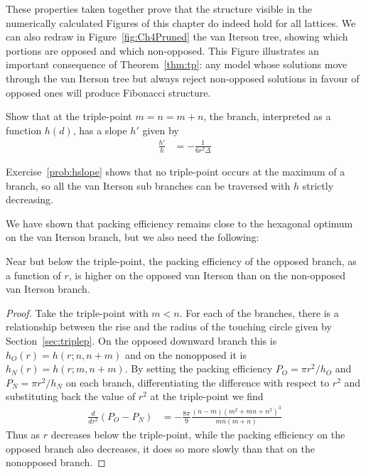 \clearpage
These properties taken together prove that the structure visible in the numerically calculated Figures of this chapter do indeed hold for all lattices. We can also redraw in Figure~\ref{fig:Ch4Pruned} the van Iterson tree, showing which portions are opposed and which non-opposed. This Figure illustrates an important consequence of Theorem~\ref{thm:tp}: any model whose solutions move through the van Iterson tree but always reject non-opposed solutions in favour of opposed ones will produce Fibonacci structure. 



\begin{jExercise}
	Show that at the triple-point  $m=n=m+n$, the  branch, interpreted as a function $h(d)$, has a slope $h'$ given by 
	\begin{align}
		\frac{h'}{h} &= - \frac{1}{6 r^2 \Delta}
	\end{align}
	\label{prob:hslope}
\end{jExercise}
Exercise~\ref{prob:hslope} shows that no triple-point occurs at the maximum of a branch, so all the van Iterson sub branches can be traversed with $h$ strictly decreasing. 

We have shown that packing efficiency remains close to the hexagonal optimum on the van Iterson branch, but we also need the following:
\begin{theorem}
	Near but below the triple-point, the packing efficiency of the opposed branch, as a function of $r$, is higher on the opposed van Iterson than on the non-opposed van Iterson branch.
\end{theorem}
\begin{proof}
	Take the triple-point  with $m<n$. For each of the branches, there is a relationship between the rise and the radius of the touching circle given by Section~\ref{sec:triplep}. On the 
	opposed downward branch  this is $h_O(r)= h(r;n,n+m)$ and on the nonopposed   it is $h_N(r)=h(r;m,n+m)$. By setting the 
	packing efficiency  $P_O=\pi r^2/h_O$ and $P_N=\pi r^2/h_N$ on each branch, differentiating the difference with respect to $r^2$ and substituting back the value of $r^2$ at the triple-point we find
	\begin{align}
		\frac{d}{dr^2}(P_O-P_N) &= - \frac{8\pi}{9}\frac{(n- m )  (m^2+m n+n^2)^3}{mn(m+n)}
	\end{align}
	Thus as $r$ decreases below the triple-point, while the packing efficiency on the opposed branch also decreases, it does so more slowly than that on the nonopposed branch.  
\end{proof}



